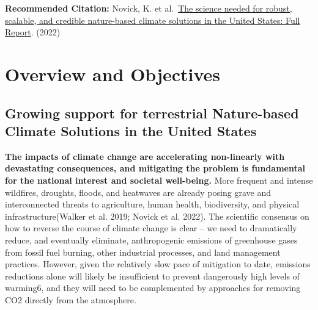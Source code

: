 \documentclass[
  letterpaper,
  DIV=11,
  numbers=noendperiod]{scrreprt}
\begin{document}
\textbf{Recommended Citation:} Novick, K. et
al.~\href{https://doi.org/10.5967/n7r9-7j83}{The science needed for
robust, scalable, and credible nature-based climate solutions in the
United States: Full Report}. (2022)


\hypertarget{sec-overview}{%
\chapter{Overview and Objectives}\label{sec-overview}}

\hypertarget{growing-support-for-terrestrial-nature-based-climate-solutions-in-the-united-states}{%
\section{Growing support for terrestrial Nature-based Climate Solutions
in the United
States}\label{growing-support-for-terrestrial-nature-based-climate-solutions-in-the-united-states}}

\textbf{The impacts of climate change are accelerating non-linearly with
devastating consequences, and mitigating the problem is fundamental for
the national interest and societal well-being.} More frequent and
intense wildfires, droughts, floods, and heatwaves are already posing
grave and interconnected threats to agriculture, human health,
biodiversity, and physical infrastructure(Walker et al. 2019; Novick et
al. 2022). The scientific consensus on how to reverse the course of
climate change is clear -- we need to dramatically reduce, and
eventually eliminate, anthropogenic emissions of greenhouse gases from
fossil fuel burning, other industrial processes, and land management
practices. However, given the relatively slow pace of mitigation to
date, emissions reductions alone will likely be insufficient to prevent
dangerously high levels of warming6, and they will need to be
complemented by approaches for removing CO2 directly from the
atmosphere.
\end{document}
